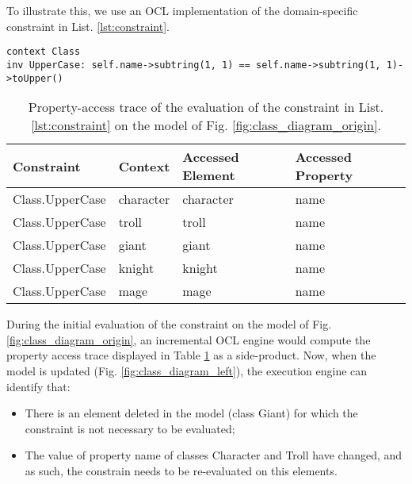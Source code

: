 To illustrate this, we use an OCL implementation of the domain-specific constraint in List. \ref{lst:constraint}.

\begin{lstlisting}[style=ocl,caption={OCL constraint requiring that a class should start with an uppercase.},label=lst:constraint]
context Class
inv UpperCase: self.name->subtring(1, 1) == self.name->subtring(1, 1)->toUpper()
\end{lstlisting}

\begin{table}[ht]
    \centering
    \caption{Property-access trace of the evaluation of the constraint in List. \ref{lst:constraint} on the model of Fig. \ref{fig:class_diagram_origin}.}
    \begin{tabular}{p{4cm} p{2.1cm} p{2cm} p{2.1cm}}
        \hline 
        \textbf{Constraint} & \textbf{Context} & \textbf{Accessed Element} & \textbf{Accessed Property} \\ 
        \hline 
        \textsf{Class.UpperCase}  & \textsf{character} & \textsf{character} & \textsf{name} \\ 
        \textsf{Class.UpperCase}  & \textsf{troll} & \textsf{troll} & \textsf{name} \\ 
        \textsf{Class.UpperCase}  & \textsf{giant} & \textsf{giant} & \textsf{name} \\ 
        \textsf{Class.UpperCase}  & \textsf{knight} & \textsf{knight} & \textsf{name} \\
        \textsf{Class.UpperCase}  & \textsf{mage} & \textsf{mage} & \textsf{name} \\
        \hline 
    \end{tabular} 
    \label{tab:property_access_trace}
\end{table}

During the initial evaluation of the constraint on the model of Fig. \ref{fig:class_diagram_origin}, an incremental OCL engine would compute the property access trace displayed in Table \ref{tab:property_access_trace} as a side-product. Now, when the model is updated (Fig. \ref{fig:class_diagram_left}), the execution engine can identify that:

\begin{itemize}
    \item There is an element deleted in the model (class \textsf{Giant}) for which the constraint is not necessary to be evaluated;
    \item The value of property \textsf{name} of classes \textsf{Character} and \textsf{Troll} have changed, and as such, the constrain needs to be re-evaluated on this elements.
\end{itemize}

